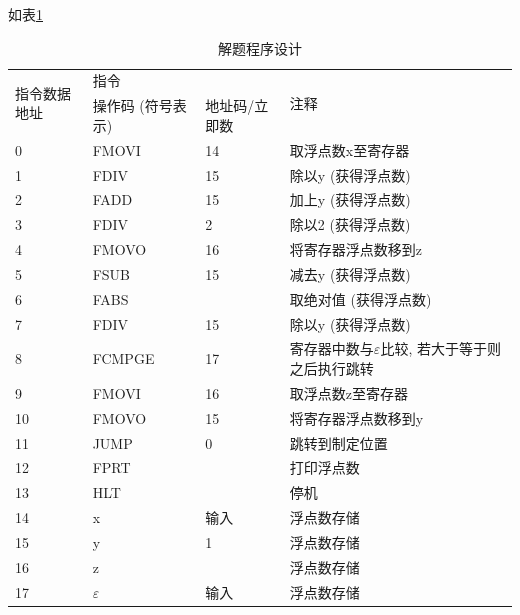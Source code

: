 \documentclass[UTF8]{report}
\newenvironment{solution}{{\noindent\hskip 2em \bf 解 \quad}}{}
\begin{document}
\begin{solution}
    如表\ref{tab:solution}
\begin{table}[htbp]
    \centering
    \caption{解题程序设计}
      \begin{tabular}{|p{60 pt}|p{80 pt}|p{80 pt}|p{130 pt}|}
      \hline
      \multicolumn{1}{|p{60 pt}|}{\multirow{2}[4]{*}{指令数据地址}} & \multicolumn{2}{l|}{指令} & \multirow{2}[4]{*}{注释} \bigstrut\\
  \cline{2-3}  & 操作码 (符号表示) & 地址码/立即数 &  \bigstrut\\
      \hline
      0       & FMOVI   & 14      & 取浮点数x至寄存器 \bigstrut\\
      \hline
      1       & FDIV    & 15      & 除以y (获得浮点数) \bigstrut\\
      \hline
      2       & FADD    & 15      & 加上y (获得浮点数) \bigstrut\\
      \hline
      3       & FDIV    & 2       & 除以2 (获得浮点数) \bigstrut\\
      \hline
      4       & FMOVO   & 16      & 将寄存器浮点数移到z \bigstrut\\
      \hline
      5       & FSUB    & 15      & 减去y (获得浮点数) \bigstrut\\
      \hline
      6       & FABS    &         & 取绝对值 (获得浮点数) \bigstrut\\
      \hline
      7       & FDIV    & 15      & 除以y (获得浮点数) \bigstrut\\
      \hline
      8       & FCMPGE  & 17      & 寄存器中数与$\varepsilon$比较, 若大于等于则之后执行跳转 \bigstrut\\
      \hline
      9       & FMOVI   & 16      & 取浮点数z至寄存器 \bigstrut\\
      \hline
      10      & FMOVO   & 15      & 将寄存器浮点数移到y \bigstrut\\
      \hline
      11      & JUMP    & 0       & 跳转到制定位置 \bigstrut\\
      \hline
      12      & FPRT    &         & 打印浮点数 \bigstrut\\
      \hline
      13      & HLT     &         & 停机 \bigstrut\\
      \hline
      14      & x       & 输入      & 浮点数存储 \bigstrut\\
      \hline
      15      & y       & 1       & 浮点数存储 \bigstrut\\
      \hline
      16      & z       &         & 浮点数存储 \bigstrut\\
      \hline
      17      & $\varepsilon$       & 输入      & 浮点数存储 \bigstrut\\
      \hline
      \end{tabular}%
    \label{tab:solution}%
  \end{table}%
    \newpage        
\end{solution}
\end{document}
